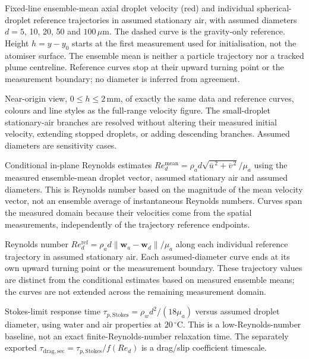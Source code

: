 \caption{Fixed-line ensemble-mean axial droplet velocity (red) and individual spherical-droplet reference trajectories in assumed stationary air, with assumed diameters $d=5$, 10, 20, 50 and $100\,\mu\mathrm{m}$. The dashed curve is the gravity-only reference. Height $h=y-y_0$ starts at the first measurement used for initialisation, not the atomiser surface. The ensemble mean is neither a particle trajectory nor a tracked plume centreline. Reference curves stop at their upward turning point or the measurement boundary; no diameter is inferred from agreement.}

\caption{Near-origin view, $0\leq h\leq2\,\mathrm{mm}$, of exactly the same data and reference curves, colours and line styles as the full-range velocity figure. The small-droplet stationary-air branches are resolved without altering their measured initial velocity, extending stopped droplets, or adding descending branches. Assumed diameters are sensitivity cases.}

\caption{Conditional in-plane Reynolds estimates $Re_d^{\mathrm{mean}}=\rho_a d\sqrt{\overline{u}^{\,2}+\overline{v}^{\,2}}/\mu_a$ using the measured ensemble-mean droplet vector, assumed stationary air and assumed diameters. This is Reynolds number based on the magnitude of the mean velocity vector, not an ensemble average of instantaneous Reynolds numbers. Curves span the measured domain because their velocities come from the spatial measurements, independently of the trajectory reference endpoints.}

\caption{Reynolds number $Re_d^{\mathrm{ref}}=\rho_a d\lVert\boldsymbol{w}_a-\boldsymbol{w}_d\rVert/\mu_a$ along each individual reference trajectory in assumed stationary air. Each assumed-diameter curve ends at its own upward turning point or the measurement boundary. These trajectory values are distinct from the conditional estimates based on measured ensemble means; the curves are not extended across the remaining measurement domain.}

\caption{Stokes-limit response time $\tau_{p,\mathrm{Stokes}}=\rho_w d^2/(18\mu_a)$ versus assumed droplet diameter, using water and air properties at $20\,^{\circ}\mathrm{C}$. This is a low-Reynolds-number baseline, not an exact finite-Reynolds-number relaxation time. The separately exported $\tau_{\mathrm{drag,sec}}=\tau_{p,\mathrm{Stokes}}/f(Re_d)$ is a drag/slip coefficient timescale.}

